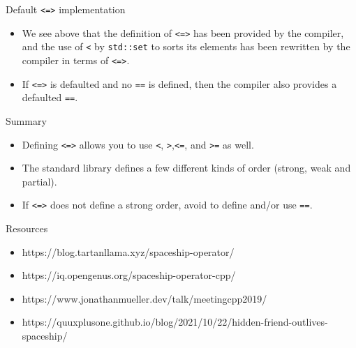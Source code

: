 \begin{frame}[fragile]
  \begin{block}{Default \texttt{<=>} implementation}
    \begin{itemize}
      \item We see above that the definition of \texttt{<=>} has been provided by the compiler, and the use of \texttt{<} by \texttt{std::set} to sorts its elements has been rewritten by the compiler in terms of \texttt{<=>}.
      \item If \texttt{<=>} is defaulted and no \texttt{==} is defined, then the compiler also provides a defaulted \texttt{==}.
    \end{itemize}
  \end{block}
\end{frame}

\begin{frame}[fragile]
  \begin{alertblock}{Summary}
    \begin{itemize}
      \item Defining \texttt{<=>} allows you to use \texttt{<}, \texttt{>},\texttt{<=}, and \texttt{>=} as well.
      \item The standard library defines a few different kinds of order (strong, weak and partial).
      \item If \texttt{<=>} does not define a strong order, avoid to define and/or use \texttt{==}.
    \end{itemize}
  \end{alertblock}
  \begin{block}{Resources}
    \begin{itemize}
      \item https://blog.tartanllama.xyz/spaceship-operator/
      \item https://iq.opengenus.org/spaceship-operator-cpp/
      \item https://www.jonathanmueller.dev/talk/meetingcpp2019/
      \item https://quuxplusone.github.io/blog/2021/10/22/hidden-friend-outlives-spaceship/
    \end{itemize}
  \end{block}
\end{frame}
